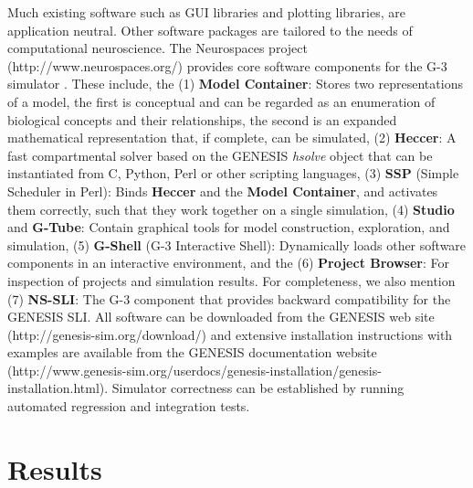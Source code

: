 \documentclass[10pt]{article}
\begin{document}
Much existing software such as GUI libraries and plotting libraries,
are application neutral.  Other software packages are tailored to the
needs of computational neuroscience.  The Neurospaces project
(http://www.neurospaces.org/) provides core software components for the
G-3 simulator \cite{cornelis03:_neuros}. These include, the (1) {\bf
  Model Container}: Stores two representations of a model, the first
is conceptual and can be regarded as an enumeration of biological
concepts and their relationships, the second is an expanded
mathematical representation that, if complete, can be simulated, (2)
{\bf Heccer}: A fast compartmental solver based on the GENESIS {\it
  hsolve} object that can be instantiated from C, Python, Perl or
other scripting languages, (3) {\bf SSP} (Simple Scheduler in Perl):
Binds {\bf Heccer} and the {\bf Model Container}, and activates them
correctly, such that they work together on a single simulation, (4)
{\bf Studio} and {\bf G-Tube}: Contain graphical tools for model
construction, exploration, and simulation, (5) {\bf G-Shell} (G-3
Interactive Shell): Dynamically loads other software components in an
interactive environment, and the (6) {\bf Project Browser}: For
inspection of projects and simulation results. For completeness, we
also mention (7) {\bf NS-SLI}: The G-3 component that provides
backward compatibility for the GENESIS SLI. All software can be
downloaded from the GENESIS web site
(http://genesis-sim.org/download/) and extensive installation
instructions with examples are available from the GENESIS
documentation website
(http://www.genesis-sim.org/userdocs/genesis-installation/genesis-installation.html).
Simulator correctness can be established by running automated
regression and integration tests.



\section*{\LARGE Results}
\end{document}
